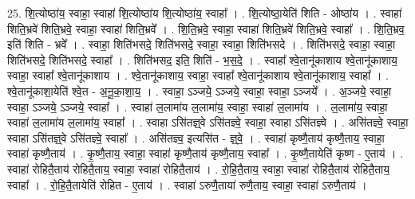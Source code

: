 \documentclass[17pt]{extarticle}
\begin{document}
25. शि॒त्योष्ठा॑य॒ स्वाहा॒ स्वाहा॑ शि॒त्योष्ठा॑य शि॒त्योष्ठा॑य॒ स्वाहा᳚ । . शि॒त्योष्ठा॒येति॑ शिति - ओष्ठा॑य । . स्वाहा॑ शिति॒भ्रवे॑ शिति॒भ्रवे॒ स्वाहा॒ स्वाहा॑ शिति॒भ्रवे᳚ । . शि॒ति॒भ्रवे॒ स्वाहा॒ स्वाहा॑ शिति॒भ्रवे॑ शिति॒भ्रवे॒ स्वाहा᳚ । . शि॒ति॒भ्रव॒ इति॑ शिति - भ्रवे᳚ । . स्वाहा॒ शिति॑भसदे॒ शिति॑भसदे॒ स्वाहा॒ स्वाहा॒ शिति॑भसदे । . शिति॑भसदे॒ स्वाहा॒ स्वाहा॒ शिति॑भसदे॒ शिति॑भसदे॒ स्वाहा᳚ । . शिति॑भसद॒ इति॒ शिति॑ - भ॒स॒दे॒ । . स्वाहा᳚ श्वे॒तानू॑काशाय श्वे॒तानू॑काशाय॒ स्वाहा॒ स्वाहा᳚ श्वे॒तानू॑काशाय । . श्वे॒तानू॑काशाय॒ स्वाहा॒ स्वाहा᳚ श्वे॒तानू॑काशाय श्वे॒तानू॑काशाय॒ स्वाहा᳚ । . श्वे॒तानू॑काशा॒येति॑ श्वे॒त - अ॒नू॒का॒शा॒य॒ । . स्वाहा॒ ऽञ्जये॒ ऽञ्जये॒ स्वाहा॒ स्वाहा॒ ऽञ्जये᳚ । . अ॒ञ्जये॒ स्वाहा॒ स्वाहा॒ ऽञ्जये॒ ऽञ्जये॒ स्वाहा᳚ । . स्वाहा॑ ल॒लामा॑य ल॒लामा॑य॒ स्वाहा॒ स्वाहा॑ ल॒लामा॑य । . ल॒लामा॑य॒ स्वाहा॒ स्वाहा॑ ल॒लामा॑य ल॒लामा॑य॒ स्वाहा᳚ । . स्वाहा ऽसि॑तज्ञ्॒वे ऽसि॑तज्ञ्वे॒ स्वाहा॒ स्वाहा ऽसि॑तज्ञ्वे । . असि॑तज्ञ्वे॒ स्वाहा॒ स्वाहा ऽसि॑तज्ञ्॒वे ऽसि॑तज्ञ्वे॒ स्वाहा᳚ । . असि॑तज्ञ्व॒ इत्यसि॑त - ज्ञ्॒वे॒ । . स्वाहा॑ कृष्णै॒ताय॑ कृष्णै॒ताय॒ स्वाहा॒ स्वाहा॑ कृष्णै॒ताय॑ । . कृ॒ष्णै॒ताय॒ स्वाहा॒ स्वाहा॑ कृष्णै॒ताय॑ कृष्णै॒ताय॒ स्वाहा᳚ । . कृ॒ष्णै॒तायेति॑ कृष्ण - ए॒ताय॑ । . स्वाहा॑ रोहितै॒ताय॑ रोहितै॒ताय॒ स्वाहा॒ स्वाहा॑ रोहितै॒ताय॑ । . रो॒हि॒तै॒ताय॒ स्वाहा॒ स्वाहा॑ रोहितै॒ताय॑ रोहितै॒ताय॒ स्वाहा᳚ । . रो॒हि॒तै॒तायेति॑ रोहित - ए॒ताय॑ । . स्वाहा॑ ऽरुणै॒ताया॑ रुणै॒ताय॒ स्वाहा॒ स्वाहा॑ ऽरुणै॒ताय॑ । \newline
\end{document}
